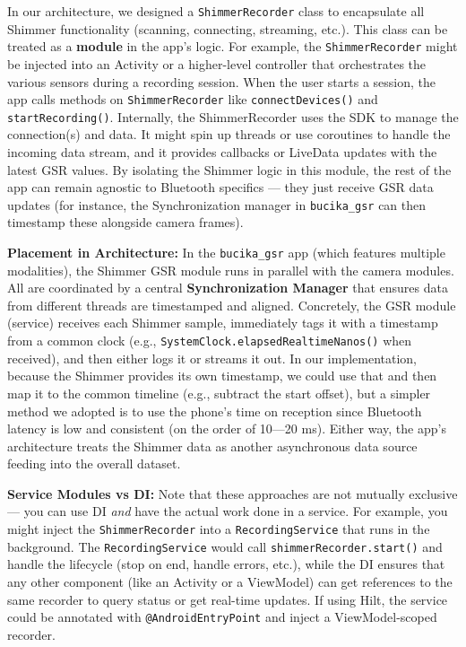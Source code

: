 In our architecture, we designed a \texttt{ShimmerRecorder} class to
encapsulate all Shimmer functionality (scanning, connecting, streaming,
etc.)\cite{GSRPPGMachineLearning2024}\cite{GSRPPGMachineLearning2024}.
This class can be treated as a \textbf{module} in the app's logic. For
example, the \texttt{ShimmerRecorder} might be injected into an Activity or a
higher-level controller that orchestrates the various sensors during a
recording session. When the user starts a session, the app calls methods
on \texttt{ShimmerRecorder} like \texttt{connectDevices()} and
\texttt{startRecording()}\cite{GSRPPGMachineLearning2024}\cite{TopdonTC001}.
Internally, the ShimmerRecorder uses the SDK to manage the connection(s)
and data. It might spin up threads or use coroutines to handle the
incoming data stream, and it provides callbacks or LiveData updates with
the latest GSR values. By isolating the Shimmer logic in this module,
the rest of the app can remain agnostic to Bluetooth specifics --- they
just receive GSR data updates (for instance, the Synchronization manager
in \texttt{bucika_gsr} can then timestamp these alongside camera frames).

\textbf{Placement in Architecture:} In the \texttt{bucika_gsr} app (which features
multiple modalities), the Shimmer GSR module runs in parallel with the
camera modules. All are coordinated by a central \textbf{Synchronization
Manager} that ensures data from different threads are timestamped and
aligned\cite{CortisolStressIndicator2020}.
Concretely, the GSR module (service) receives each Shimmer sample,
immediately tags it with a timestamp from a common clock (e.g.,
\texttt{SystemClock.elapsedRealtimeNanos()} when
received)\cite{CortisolStressIndicator2020}\cite{DeviceServer},
and then either logs it or streams it out. In our implementation,
because the Shimmer provides its own timestamp, we could use that and
then map it to the common timeline (e.g., subtract the start offset),
but a simpler method we adopted is to use the phone's time on reception
since Bluetooth latency is low and consistent (on the order of 10---20
ms)\cite{DeviceServer}.
Either way, the app's architecture treats the Shimmer data as another
asynchronous data source feeding into the overall dataset.

\textbf{Service Modules vs DI:} Note that these approaches are not mutually
exclusive --- you can use DI \textit{and} have the actual work done in a
service. For example, you might inject the \texttt{ShimmerRecorder} into a
\texttt{RecordingService} that runs in the background. The \texttt{RecordingService}
would call \texttt{shimmerRecorder.start()} and handle the lifecycle (stop on
end, handle errors, etc.), while the DI ensures that any other component
(like an Activity or a ViewModel) can get references to the same
recorder to query status or get real-time updates. If using Hilt, the
service could be annotated with \texttt{@AndroidEntryPoint} and inject a
ViewModel-scoped recorder.

